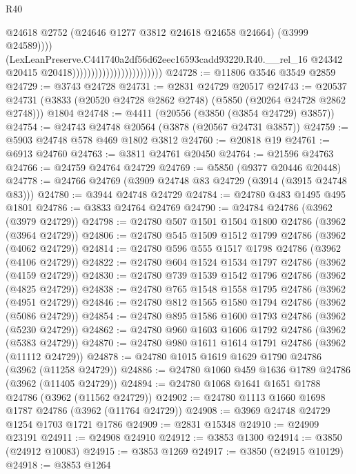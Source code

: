 \begin{lexlean}{R40}
\begin{coremodule}
                                                        @24618
                                                        @2752
                                                        (@24646 @1277 @3812 @24618 @24658 @24664)
                                                        (@3999 @24589))))
                                                  (LexLeanPreserve.C441740a2df56d62eec16593cadd93220.R40.__rel_16
                                                    @24342
                                                    @20415
                                                    @20418))))))))))))))))))))))))
@24728 := @11806 @3546 @3549 @2859
@24729 := @3743 @24728
@24731 := @2831 @24729 @20517
@24743 := @20537
    @24731
    (@3833 (@20520 @24728 @2862 @2748) (@5850 (@20264 @24728 @2862 @2748)))
    @1804
@24748 := @4411 (@20556 (@3850 (@3854 @24729) @3857))
@24754 := @24743 @24748 @20564 (@3878 (@20567 @24731 @3857))
@24759 := @5903 @24748 @578 @469 @1802 @3812
@24760 := @20818 @19
@24761 := @6913 @24760
@24763 := @3811 @24761 @20450
@24764 := @21596 @24763
@24766 := @24759 @24764 @24729
@24769 := @5850 (@9377 @20446 @20448)
@24778 := @24766 @24769 (@3909 @24748 @83 @24729 (@3914 (@3915 @24748 @83)))
@24780 := @3944 @24748 @24729
@24784 := @24780 @483 @1495 @495 @1801
@24786 := @3833 @24764 @24769
@24790 := @24784 @24786 (@3962 (@3979 @24729))
@24798 := @24780 @507 @1501 @1504 @1800 @24786 (@3962 (@3964 @24729))
@24806 := @24780 @545 @1509 @1512 @1799 @24786 (@3962 (@4062 @24729))
@24814 := @24780 @596 @555 @1517 @1798 @24786 (@3962 (@4106 @24729))
@24822 := @24780 @604 @1524 @1534 @1797 @24786 (@3962 (@4159 @24729))
@24830 := @24780 @739 @1539 @1542 @1796 @24786 (@3962 (@4825 @24729))
@24838 := @24780 @765 @1548 @1558 @1795 @24786 (@3962 (@4951 @24729))
@24846 := @24780 @812 @1565 @1580 @1794 @24786 (@3962 (@5086 @24729))
@24854 := @24780 @895 @1586 @1600 @1793 @24786 (@3962 (@5230 @24729))
@24862 := @24780 @960 @1603 @1606 @1792 @24786 (@3962 (@5383 @24729))
@24870 := @24780 @980 @1611 @1614 @1791 @24786 (@3962 (@11112 @24729))
@24878 := @24780 @1015 @1619 @1629 @1790 @24786 (@3962 (@11258 @24729))
@24886 := @24780 @1060 @459 @1636 @1789 @24786 (@3962 (@11405 @24729))
@24894 := @24780 @1068 @1641 @1651 @1788 @24786 (@3962 (@11562 @24729))
@24902 := @24780 @1113 @1660 @1698 @1787 @24786 (@3962 (@11764 @24729))
@24908 := @3969 @24748 @24729 @1254 @1703 @1721 @1786
@24909 := @2831 @15348
@24910 := @24909 @23191
@24911 := @24908 @24910
@24912 := @3853 @1300
@24914 := @3850 (@24912 @10083)
@24915 := @3853 @1269
@24917 := @3850 (@24915 @10129)
@24918 := @3853 @1264

\end{coremodule}
\end{lexlean}
